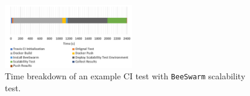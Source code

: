 \begin{figure}[h]
    \centering
    \includegraphics[width=0.5\textwidth]{figures/perf.pdf}
    \caption{Time breakdown of an example CI test with \texttt{BeeSwarm} scalability test.}
    \label{breakdown}
\end{figure}

